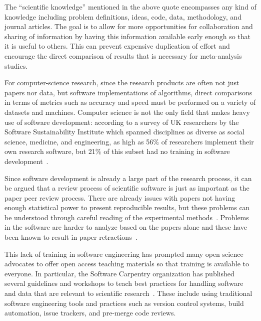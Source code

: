 The ``scientific knowledge'' mentioned in the above quote
encompasses any kind of knowledge including problem definitions,
ideas, code, data, methodology, and journal articles. The goal is
to allow for more opportunities for collaboration and sharing of
information by having this information available early enough so
that it is useful to others. This can prevent expensive
duplication of effort and encourage the direct comparison of
results that is necessary for meta-analysis studies.

For computer-science research, since the research
products are often not just papers nor data, but software
implementations of algorithms, direct comparisons in terms of
metrics such as accuracy and speed must be performed on a variety of
datasets and machines. Computer science is not the only field that
makes heavy use of software development:
according to a survey of UK researchers by the Software
Sustainability Institute which spanned disciplines as diverse as
social science, medicine, and engineering, as high as 56\% of
researchers implement their own research software, but 21\% of
this subset had no training in software
development~\autocite{SSI:hettrick_2014_14809}.

Since software development is already a large part of the research
process, it can be argued that a review process of scientific
software is just as important as the paper peer review process.
There are already issues with papers not having enough statistical power
to present reproducible results, but these problems can be
understood through careful reading of the experimental
methods~\autocite{Ioannidis2005,Button2013}. Problems in the software
are harder to analyze based on the papers alone and these have
been known to result in paper retractions~\autocite{Miller2006,Merali2010,Joppa2013}.

This lack of training in software engineering has prompted many
open science advocates to offer open access teaching
materials so that training is available to everyone.
In particular, the Software Carpentry organization has
published several guidelines and workshops to teach best
practices for handling software and data that are relevant to
scientific research~\autocite{Wilson2006,Wilson2014}. These
include using traditional software engineering tools and practices
such as version control systems, build automation, issue
trackers, and pre-merge code reviews.

